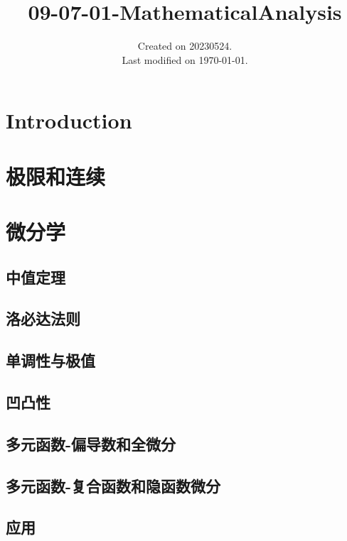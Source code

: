 \documentclass[UTF8]{../../09-Mathematics}
\begin{document}
\title{09-07-01-MathematicalAnalysis}
\date{Created on 20230524.\\   Last modified on \today.}
\maketitle
\tableofcontents


\chapter{Introduction}






\chapter{极限和连续}

\chapter{微分学}

\section{中值定理}
\section{洛必达法则}
\section{单调性与极值}
\section{凹凸性}

\section{多元函数-偏导数和全微分}

\section{多元函数-复合函数和隐函数微分}


\section{应用}
\end{document}
